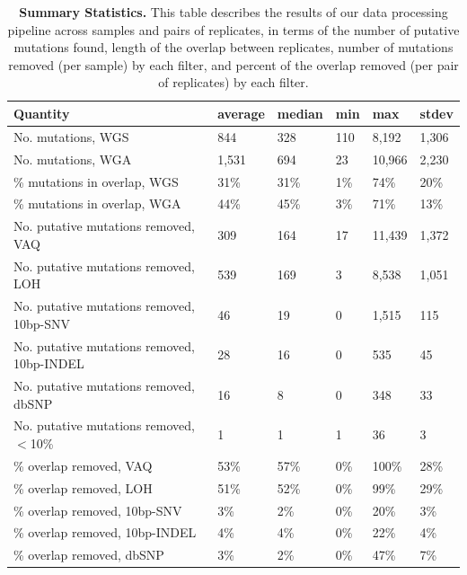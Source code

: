 \documentclass[11 pt]{article} %
\begin{document}
\begin{landscape}
\begin{table}
\caption{\textbf{Summary Statistics.} This table describes the results of our data processing pipeline across samples and pairs of replicates, in terms of the number of putative mutations found, length of the overlap between replicates, number of mutations removed (per sample) by each filter, and percent of the overlap removed (per pair of replicates) by each filter.}
\label{tab:summary_stats}
\begin{tabular}{ p{8cm} p{2cm} p{2cm} p{2cm}p{2cm}p{2cm} }
	Quantity & average & median & min & max & stdev \\
	\hline
	No. mutations, WGS & 844 & 328 & 110 & 8,192 & 1,306 \\
	No. mutations, WGA & 1,531 & 694 & 23 & 10,966 & 2,230 \\
	\% mutations in overlap, WGS & 31\% & 31\% & 1\% & 74\% & 20\% \\
	\% mutations in overlap, WGA & 44\% & 45\% & 3\% & 71\% & 13\% \\
	No. putative mutations removed, VAQ & 309 & 164 & 17 & 11,439 & 1,372 \\
	No. putative mutations removed, LOH & 539 & 169 & 3 & 8,538 & 1,051 \\
	No. putative mutations removed, 10bp-SNV & 46 & 19 & 0 & 1,515 & 115 \\
	No. putative mutations removed, 10bp-INDEL & 28 & 16 & 0 & 535 & 45 \\
	No. putative mutations removed, dbSNP & 16 & 8 & 0 & 348 & 33 \\
	No. putative mutations removed, $<$10\% & 1 & 1 & 1 & 36 & 3 \\
	\% overlap removed, VAQ & 53\% & 57\% & 0\% & 100\% & 28\% \\
	\% overlap removed, LOH & 51\% & 52\% & 0\% & 99\% & 29\% \\
	\% overlap removed, 10bp-SNV & 3\% & 2\% & 0\% & 20\% & 3\% \\
	\% overlap removed, 10bp-INDEL & 4\% & 4\% & 0\% & 22\% & 4\% \\
	\% overlap removed, dbSNP & 3\% & 2\% & 0\% & 47\% & 7\% \\
\end{tabular}
\end{table}
\end{landscape}
\end{document}

